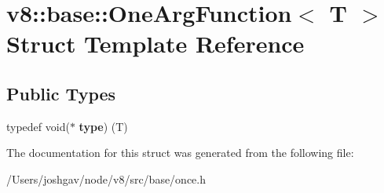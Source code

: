 \hypertarget{structv8_1_1base_1_1_one_arg_function}{}\section{v8\+:\+:base\+:\+:One\+Arg\+Function$<$ T $>$ Struct Template Reference}
\label{structv8_1_1base_1_1_one_arg_function}
\subsection*{Public Types}
\begin{DoxyCompactItemize}
\item 
typedef void($\ast$ {\bfseries type}) (T)\hypertarget{structv8_1_1base_1_1_one_arg_function_a4b19686c2b01edf335876d1a849d85a0}{}\label{structv8_1_1base_1_1_one_arg_function_a4b19686c2b01edf335876d1a849d85a0}

\end{DoxyCompactItemize}


The documentation for this struct was generated from the following file\+:\begin{DoxyCompactItemize}
\item 
/\+Users/joshgav/node/v8/src/base/once.\+h\end{DoxyCompactItemize}
